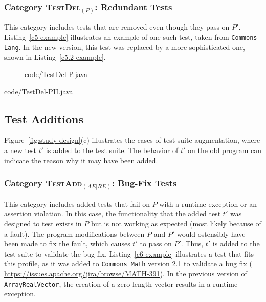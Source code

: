 \documentclass[conference]{IEEEtran}
\newcommand{\lang}[1]{\texttt{\small #1}}
\newcommand{\subject}[1]{\texttt{\small #1}}
\newcommand{\mt}{\mathit}
\newcommand{\catdelp}{\textsc{TestDel}$_\mt{(P)}$}
\newcommand{\cataddaere}{\textsc{TestAdd}$_\mt{(AE|RE)}$}
\begin{document}
\subsubsection{Category \catdelp: Redundant Tests}
\label{sec:category-delp}

This category includes tests that are removed even though they pass on
$P'$.  Listing~\ref{c5-example} illustrates an example of one such
test, taken from \subject{Commons Lang}. In the new version, this test
was replaced by a more sophisticated one, shown in
Listing~\ref{c5.2-example}.

\begin{figure}[h]
 {code/TestDel-P.java}
\vspace{4pt}
\end{figure}

 {code/TestDel-PII.java}

\subsection{Test Additions}
\label{sec:test-add}

Figure~\ref{fig:study-design}(c) illustrates the cases of test-suite
augmentation, where a new test $t'$ is added to the test suite. The
behavior of $t'$ on the old program can indicate the reason why it may
have been added.

\subsubsection{Category \cataddaere: Bug-Fix Tests}
\label{sec:category-addaere}

This category includes added tests that fail on $P$ with a runtime
exception or an assertion violation. In this case, the functionality
that the added test $t'$ was designed to test exists in $P$ but is not
working as expected (most likely because of a fault). The program
modifications between $P$ and $P'$ would ostensibly have been made to
fix the fault, which causes $t'$ to pass on $P'$. Thus, $t'$ is added
to the test suite to validate the bug fix. Listing~\ref{c6-example}
illustrates a test that fits this profile, as it was added to
\subject{Commons Math} version 2.1 to validate a bug fix ({\small
  \url{https://issues.apache.org/jira/browse/MATH-391}}). In the
previous version of \lang{ArrayRealVector}, the creation of a
zero-length vector results in a runtime exception.
\end{document}
